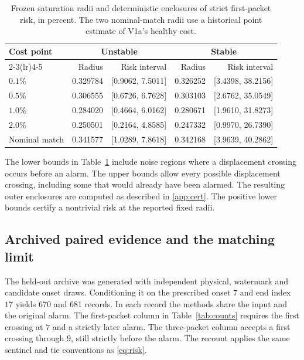 \begin{table}[htbp]
\centering
\small
\caption{Frozen saturation radii and deterministic enclosures of strict first-packet risk, in percent. The two nominal-match radii use a historical point estimate of V1a's healthy cost.}
\label{tab:cert}
\begin{tabular}{lrrrr}
\toprule
Cost point & \multicolumn{2}{c}{Unstable} & \multicolumn{2}{c}{Stable}\\
\cmidrule(lr){2-3}\cmidrule(lr){4-5}
 & Radius & Risk interval & Radius & Risk interval\\
\midrule
\(0.1\%\) & 0.329784 & [0.9062, 7.5011] & 0.326252 & [3.4398, 38.2156]\\
\(0.5\%\) & 0.306555 & [0.6726, 6.7628] & 0.303103 & [2.6762, 35.0549]\\
\(1.0\%\) & 0.284020 & [0.4664, 6.0162] & 0.280671 & [1.9610, 31.8273]\\
\(2.0\%\) & 0.250501 & [0.2164, 4.8585] & 0.247332 & [0.9970, 26.7390]\\
Nominal match & 0.341577 & [1.0289, 7.8618] & 0.342168 & [3.9639, 40.2862]\\
\bottomrule
\end{tabular}
\end{table}

The lower bounds in Table~\ref{tab:cert} include noise regions where a displacement crossing occurs before an alarm. The upper bounds allow every possible displacement crossing, including some that would already have been alarmed. The resulting outer enclosures are computed as described in \ref{app:cert}. The positive lower bounds certify a nontrivial risk at the reported fixed radii.

\subsection{Archived paired evidence and the matching limit}

The held-out archive was generated with independent physical, watermark and candidate onset draws. Conditioning it on the prescribed onset \(7\) and end index \(17\) yields 670 and 681 records. In each record the methods share the input and the original alarm. The first-packet column in Table~\ref{tab:counts} requires the first crossing at \(7\) and a strictly later alarm. The three-packet column accepts a first crossing through \(9\), still strictly before the alarm. The recount applies the same sentinel and tie conventions as \eqref{eq:risk}.

